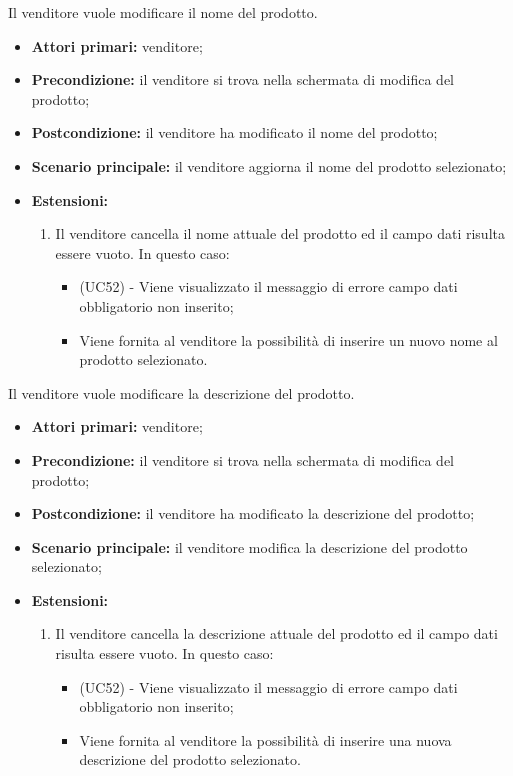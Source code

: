 Il venditore vuole modificare il nome del prodotto.
\begin{itemize}
    \item \textbf{Attori primari:} venditore;
    \item \textbf{Precondizione:} il venditore si trova nella schermata di modifica del prodotto;
    \item \textbf{Postcondizione:} il venditore ha modificato il nome del prodotto;
    \item \textbf{Scenario principale:} il venditore aggiorna il nome del prodotto selezionato;
    \item \textbf{Estensioni:}
    \begin{enumerate}[label=\lett]
    	\item Il venditore cancella il nome attuale del prodotto ed il campo dati risulta essere vuoto. In questo caso:
    	\begin{itemize}
    		\item (UC52) - Viene visualizzato il messaggio di errore campo dati obbligatorio non inserito;
    		\item Viene fornita al venditore la possibilità di inserire un nuovo nome al prodotto selezionato.
    	\end{itemize}
    \end{enumerate}
\end{itemize}

Il venditore vuole modificare la descrizione del prodotto.
\begin{itemize}
    \item \textbf{Attori primari:} venditore;
    \item \textbf{Precondizione:} il venditore si trova nella schermata di modifica del prodotto;
    \item \textbf{Postcondizione:} il venditore ha modificato la descrizione del prodotto;
    \item \textbf{Scenario principale:} il venditore modifica la descrizione del prodotto selezionato;
    \item \textbf{Estensioni:}
    \begin{enumerate}[label=\lett]
    	\item Il venditore cancella la descrizione attuale del prodotto ed il campo dati risulta essere vuoto. In questo caso:
    	\begin{itemize}
    		\item (UC52) - Viene visualizzato il messaggio di errore campo dati obbligatorio non inserito;
    		\item Viene fornita al venditore la possibilità di inserire una nuova descrizione del prodotto selezionato.
    	\end{itemize}
    \end{enumerate}
\end{itemize}

